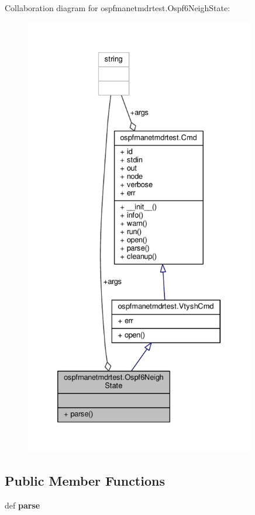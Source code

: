 Collaboration diagram for ospfmanetmdrtest.\+Ospf6\+Neigh\+State\+:
\nopagebreak
\begin{figure}[H]
\begin{center}
\leavevmode
\includegraphics[height=550pt]{classospfmanetmdrtest_1_1_ospf6_neigh_state__coll__graph}
\end{center}
\end{figure}
\subsection*{Public Member Functions}
\begin{DoxyCompactItemize}
\item 
\hypertarget{classospfmanetmdrtest_1_1_ospf6_neigh_state_ac229aa45b40c276a47d09917a731395e}{def {\bfseries parse}}\label{classospfmanetmdrtest_1_1_ospf6_neigh_state_ac229aa45b40c276a47d09917a731395e}

\end{DoxyCompactItemize}
